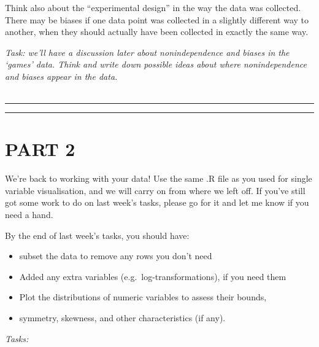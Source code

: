 \documentclass[
]{book}
\providecommand{\tightlist}{%
  \setlength{\itemsep}{0pt}\setlength{\parskip}{0pt}}
\begin{document}
Think also about the ``experimental design'' in the way the data was collected.
There may be biases if one data point was collected in a slightly different
way to another, when they should actually have been collected in exactly the
same way.

\emph{Task: we'll have a discussion later about nonindependence and biases in the
`games' data. Think and write down possible ideas about where nonindependence
and biases appear in the data.}\\
~\\

\begin{center}\rule{0.5\linewidth}{\linethickness}\end{center}

\begin{center}\rule{0.5\linewidth}{\linethickness}\end{center}

\hypertarget{part-2}{%
\section{PART 2}\label{part-2}}

We're back to working with your data! Use the same .R file as you used for
single variable visualisation, and we will carry on from where we left off.
If you've still got some work to do on last week's tasks, please go for it and let
me know if you need a hand.

By the end of last week's tasks, you should have:

\begin{itemize}
\tightlist
\item
  subset the data to remove any rows you don't need
\item
  Added any extra variables (e.g.~log-transformations), if you need them
\item
  Plot the distributions of numeric variables to assess their bounds,
\item
  symmetry, skewness, and other characteristics (if any).\\
\end{itemize}

\emph{Tasks:}
\end{document}
